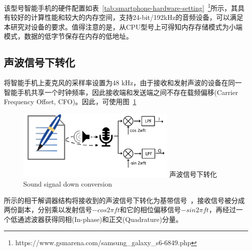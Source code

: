 该型号智能手机的硬件配置如表~\ref{tab:smartphone-hardware-setting}~\footnote{https://www.gsmarena.com/samsung\_galaxy\_s6-6849.php}所示，其具有较好的计算性能和较大的内存空间，支持24-bit/192kHz的音频设备，可以满足本研究对设备的要求。值得注意的是，从CPU型号上可得知内存存储模式为小端模式，数据的低字节保存在内存的低地址。

\subsection{声波信号下转化}
将智能手机上麦克风的采样率设置为48 kHz，由于接收和发射声波的设备在同一智能手机共享一个时钟频率，因此接收端和发送端之间不存在载频偏移(Carrier Frequency Offset, CFO)。因此，可使用图~\ref{fig:sound-signal-down-conversion}
\begin{figure}[!htp]
  \centering
  \includegraphics[width=0.7\textwidth]{figure/down-conversion.pdf}
  \bicaption
    {声波信号下转化}
    {Sound signal down conversion}
  \label{fig:sound-signal-down-conversion}
\end{figure}
所示的相干解调器结构将接收到的声波信号下转化为基带信号~\cite{tse2005fundamentals}，接收信号被分成两份副本，分别乘以发射信号$-cos2\pi ft$和它的相位偏移信号$-sin2\pi ft$，再经过一个低通滤波器获得同相(In-phase)和正交(Quadrature)分量。

